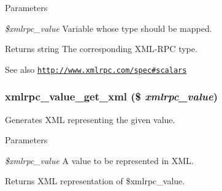 \begin{DoxyParams}{Parameters}
\item[{\em \$xmlrpc\_\-value}]Variable whose type should be mapped.\end{DoxyParams}
\begin{DoxyReturn}{Returns}
string The corresponding XML-\/RPC type.
\end{DoxyReturn}
\begin{DoxySeeAlso}{See also}
\href{http://www.xmlrpc.com/spec#scalars}{\tt http://www.xmlrpc.com/spec\#scalars} 
\end{DoxySeeAlso}
\hypertarget{xmlrpc_8inc_ad06538892136f5c1edb0580b2432e189}{
\subsubsection[{xmlrpc\_\-value\_\-get\_\-xml}]{\setlength{\rightskip}{0pt plus 5cm}xmlrpc\_\-value\_\-get\_\-xml (\$ {\em xmlrpc\_\-value})}}
\label{xmlrpc_8inc_ad06538892136f5c1edb0580b2432e189}
Generates XML representing the given value.


\begin{DoxyParams}{Parameters}
\item[{\em \$xmlrpc\_\-value}]A value to be represented in XML.\end{DoxyParams}
\begin{DoxyReturn}{Returns}
XML representation of \$xmlrpc\_\-value. 
\end{DoxyReturn}
